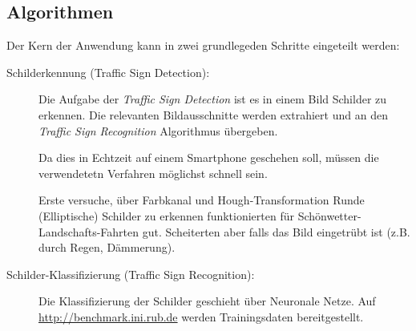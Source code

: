 \subsection*{Algorithmen}
    Der Kern der Anwendung kann in zwei grundlegeden Schritte eingeteilt werden:
    \begin{description}
        \item[Schilderkennung (Traffic Sign Detection):]
            Die Aufgabe der \emph{Traffic Sign Detection} ist es in einem Bild Schilder zu erkennen.
            Die relevanten Bildausschnitte werden extrahiert und an den \emph{Traffic Sign Recognition}
            Algorithmus übergeben.

            Da dies in Echtzeit auf einem Smartphone geschehen soll, müssen die verwendetetn Verfahren
            möglichst schnell sein.
            
            Erste versuche, über Farbkanal und Hough-Transformation Runde (Elliptische) Schilder zu 
            erkennen funktionierten für Schönwetter-Landschafts-Fahrten gut.
            Scheiterten aber falls das Bild eingetrübt ist (z.B. durch Regen, Dämmerung).

        \item[Schilder-Klassifizierung (Traffic Sign Recognition):]
            Die Klassifizierung der Schilder geschieht über Neuronale Netze.
            Auf \url{http://benchmark.ini.rub.de} werden Trainingsdaten bereitgestellt.
    \end{description}
